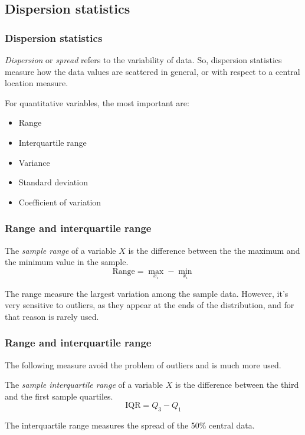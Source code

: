\subsection{Dispersion statistics}
\begin{frame}
\frametitle{Dispersion statistics}
\emph{Dispersion} or \emph{spread} refers to the variability of data. 
So, dispersion statistics measure how the data values are scattered in general, or with respect to a central location
measure. 

For quantitative variables, the most important are:
\begin{itemize}
\item Range
\item Interquartile range
\item Variance
\item Standard deviation
\item Coefficient of variation
\end{itemize}
\end{frame}


\begin{frame}
\frametitle{Range and interquartile range}
\begin{definition}
The \emph{sample range} of a variable $X$ is the difference between the the maximum and the minimum value in the sample.
\[\text{Range} = \max_{x_i} -\min_{x_i}\]
\end{definition}

The range measure the largest variation among the sample data. 
However, it's very sensitive to outliers, as they appear at the ends of the distribution, and for that reason is
rarely used. 
\begin{center}
\scalebox{0.8}{}
\end{center}
\end{frame}


\begin{frame}
\frametitle{Range and interquartile range}
The following measure avoid the problem of outliers and is much more used.

\begin{definition}
The \emph{sample interquartile range} of a variable $X$ is the difference between the third and the first
sample quartiles.
\[\text{IQR} = Q_3 -Q_1\]
\end{definition}
\begin{center}
\scalebox{0.8}{}
\end{center}

The interquartile range measures the spread of the 50\% central data.
\end{frame}


